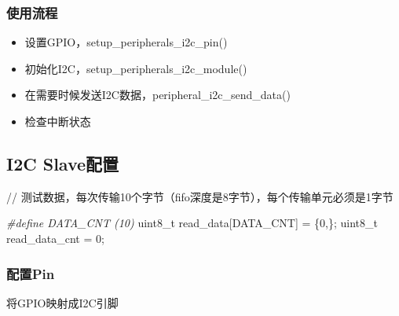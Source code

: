 \documentclass[
  12pt,
]{book}
\newenvironment{Shaded}{\begin{snugshade}}{\end{snugshade}}
\newcommand{\DataTypeTok}[1]{\textcolor[rgb]{0.13,0.29,0.53}{#1}}
\newcommand{\DecValTok}[1]{\textcolor[rgb]{0.00,0.00,0.81}{#1}}
\newcommand{\NormalTok}[1]{#1}
\newcommand{\PreprocessorTok}[1]{\textcolor[rgb]{0.56,0.35,0.01}{\textit{#1}}}
\providecommand{\tightlist}{%
  \setlength{\itemsep}{0pt}\setlength{\parskip}{0pt}}
\begin{document}
\hypertarget{ux4f7fux7528ux6d41ux7a0b-2}{%
\subsubsection{使用流程}\label{ux4f7fux7528ux6d41ux7a0b-2}}

\begin{itemize}
\tightlist
\item
  设置GPIO，setup\_peripherals\_i2c\_pin()
\item
  初始化I2C，setup\_peripherals\_i2c\_module()
\item
  在需要时候发送I2C数据，peripheral\_i2c\_send\_data()
\item
  检查中断状态
\end{itemize}

\hypertarget{i2c-slaveux914dux7f6e-1}{%
\subsection{I2C Slave配置}\label{i2c-slaveux914dux7f6e-1}}

// 测试数据，每次传输10个字节（fifo深度是8字节），每个传输单元必须是1字节

\begin{Shaded}
\begin{Highlighting}[]
\PreprocessorTok{#define DATA_CNT (10)}
\DataTypeTok{uint8_t}\NormalTok{ read_data[DATA_CNT] = \{}\DecValTok{0}\NormalTok{,\};}
\DataTypeTok{uint8_t}\NormalTok{ read_data_cnt = }\DecValTok{0}\NormalTok{;}
\end{Highlighting}
\end{Shaded}

\hypertarget{ux914dux7f6epin-3}{%
\subsubsection{配置Pin}\label{ux914dux7f6epin-3}}

将GPIO映射成I2C引脚
\end{document}
